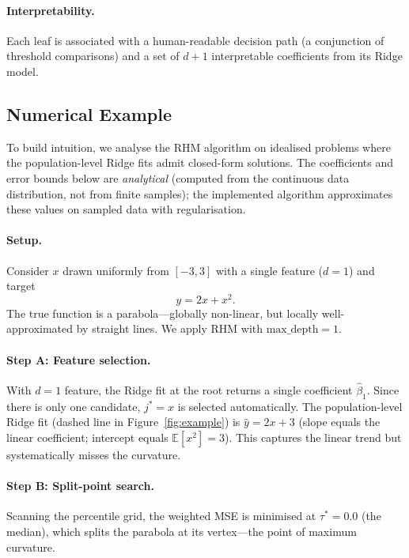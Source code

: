 \documentclass[11pt,a4paper]{article}
\begin{document}
\paragraph{Interpretability.} Each leaf is associated with a human-readable decision path (a conjunction of threshold comparisons) and a set of $d + 1$ interpretable coefficients from its Ridge model.

\subsection{Numerical Example}\label{sec:example}

To build intuition, we analyse the RHM algorithm on idealised problems where the population-level Ridge fits admit closed-form solutions. The coefficients and error bounds below are \emph{analytical} (computed from the continuous data distribution, not from finite samples); the implemented algorithm approximates these values on sampled data with regularisation.

\paragraph{Setup.} Consider $x$ drawn uniformly from $[-3, 3]$ with a single feature ($d=1$) and target
\[
    y = 2x + x^2.
\]
The true function is a parabola---globally non-linear, but locally well-approximated by straight lines. We apply RHM with $\text{max\_depth} = 1$.

\paragraph{Step A: Feature selection.} With $d=1$ feature, the Ridge fit at the root returns a single coefficient $\hat{\beta}_1$. Since there is only one candidate, $j^* = x$ is selected automatically. The population-level Ridge fit (dashed line in Figure~\ref{fig:example}) is $\hat{y} = 2x + 3$ (slope equals the linear coefficient; intercept equals $\mathbb{E}[x^2] = 3$). This captures the linear trend but systematically misses the curvature.

\paragraph{Step B: Split-point search.} Scanning the percentile grid, the weighted MSE is minimised at $\tau^* = 0.0$ (the median), which splits the parabola at its vertex---the point of maximum curvature.
\end{document}
